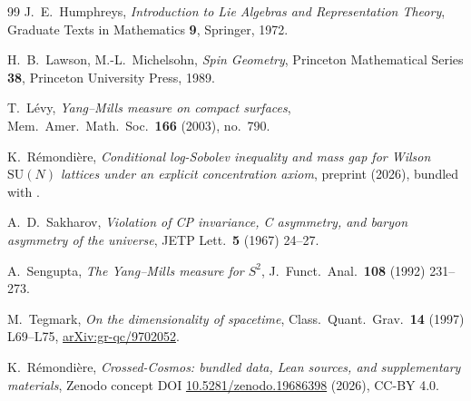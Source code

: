 \documentclass[11pt,reqno]{amsart}
\theoremstyle{plain}
\theoremstyle{definition}
\theoremstyle{remark}
\begin{document}
\begin{thebibliography}{99}
J.~E.~Humphreys,
\emph{Introduction to Lie Algebras and Representation Theory},
Graduate Texts in Mathematics \textbf{9}, Springer, 1972.

H.~B.~Lawson, M.-L.~Michelsohn,
\emph{Spin Geometry},
Princeton Mathematical Series \textbf{38}, Princeton University Press, 1989.

T.~L\'evy,
\emph{Yang--Mills measure on compact surfaces},
Mem.\ Amer.\ Math.\ Soc.\ \textbf{166} (2003), no.\ 790.

K.~R\'emondi\`ere,
\emph{Conditional log-Sobolev inequality and mass gap for Wilson $\mathrm{SU}(N)$ lattices under an explicit concentration axiom},
preprint (2026), bundled with \cite{ZenodoConcept}.

A.~D.~Sakharov,
\emph{Violation of CP invariance, C asymmetry, and baryon asymmetry of the universe},
JETP Lett.\ \textbf{5} (1967) 24--27.

A.~Sengupta,
\emph{The Yang--Mills measure for $S^2$},
J.~Funct.\ Anal.\ \textbf{108} (1992) 231--273.

M.~Tegmark,
\emph{On the dimensionality of spacetime},
Class.\ Quant.\ Grav.\ \textbf{14} (1997) L69--L75,
\href{https://arxiv.org/abs/gr-qc/9702052}{arXiv:gr-qc/9702052}.

K.~R\'emondi\`ere,
\emph{Crossed-Cosmos: bundled data, Lean sources, and supplementary materials},
Zenodo concept DOI \href{https://doi.org/10.5281/zenodo.19686398}{10.5281/zenodo.19686398} (2026), CC-BY 4.0.

\end{thebibliography}
\end{document}
